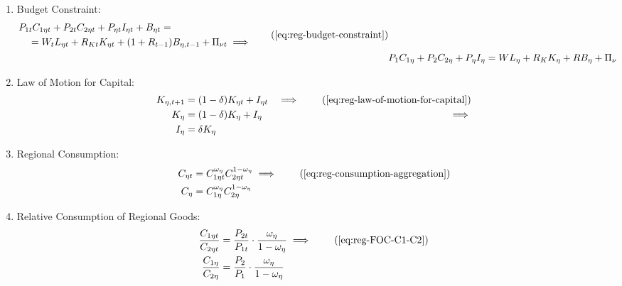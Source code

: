 \documentclass[
thesis.tex
]{subfiles}
\begin{document}
\begin{enumerate}

	\item Budget Constraint: 
	\begin{align}
	\begin{split}
		& P_{1t} C_{1\eta t} + P_{2t} C_{2\eta t} + P_{\eta t} I_{\eta t} + B_{\eta t} = \\ & \quad = W_t L_{\eta t} + R_{Kt} K_{\eta t} + (1 + R_{t-1}) B_{\eta,t-1} + \Pi_{\nu t} \implies
	\end{split} \tag{\ref{eq:reg-budget-constraint}}
	\\
	& P_{1} C_{1\eta} + P_{2} C_{2\eta} + P_{\eta} I_{\eta} = W L_{\eta} + R_{K} K_{\eta} + R B_{\eta} + \Pi_{\nu} \label{eq:reg-ss-household-budget-constraint}
	\end{align}

	\item Law of Motion for Capital:
	\begin{alignat}{2}
		K_{\eta, t+1} &= (1-\delta)K_{\eta t} + I_{\eta t} &\implies \tag{\ref{eq:reg-law-of-motion-for-capital}} \\
		K_{\eta} &= (1-\delta)K_{\eta} + I_{\eta} &\implies \nonumber \\
		I_{\eta} &= \delta K_{\eta} \label{eq:reg-ss-law-of-motion-for-capital}
	\end{alignat}

	\item Regional Consumption:
	\begin{align}
		C_{\eta t} &= C_{1\eta t}^{\omega_{\eta}} C_{2\eta t}^{1-\omega_{\eta}} \implies \tag{\ref{eq:reg-consumption-aggregation}} \\
		C_{\eta} &= C_{1\eta}^{\omega_{\eta}} C_{2\eta}^{1-\omega_{\eta}} \label{eq:reg-ss-consumption-aggregation}
	\end{align}


	\item Relative Consumption of Regional Goods:
	\begin{align}
		\frac{C_{1\eta t}}{C_{2\eta t}} &= \frac{P_{2t}}{P_{1t}} \cdot \frac{\omega_{\eta}}{1 -\omega_{\eta}} \implies \tag{\ref{eq:reg-FOC-C1-C2}}\\
		\frac{C_{1\eta}}{C_{2\eta}} &= \frac{P_{2}}{P_{1}} \cdot \frac{\omega_{\eta}}{1 -\omega_{\eta}} \label{eq:reg-ss-FOC-C1-C2}
	\end{align}



\end{enumerate}
\end{document}

